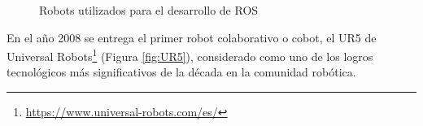   \begin{figure}[H]
    \begin{center}
      \subcapcentertrue
      \hspace{7mm}
    \end{center}
    \caption{Robots utilizados para el desarrollo de ROS}
    \label{fig:PR_ROS}
  \end{figure}
En el año 2008 se entrega el primer robot colaborativo o cobot, el UR5 de Universal Robots\footnote{\url{https://www.universal-robots.com/es/}} (Figura \ref{fig:UR5}), considerado como uno de los logros tecnológicos más significativos de la década en la comunidad robótica.\cite{Cusano22} %
  
